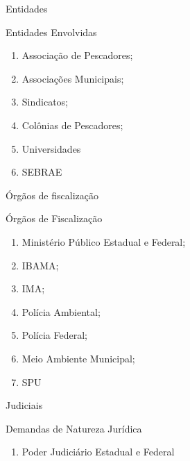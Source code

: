 \documentclass[ignorenonframetext,8pt]{beamer}
\begin{document}
\begin{frame}{Entidades}
\protect\hypertarget{entidades}{}

\begin{block}{Entidades Envolvidas}
\begin{enumerate}
  \item Associação de Pescadores;
  \item Associações Municipais;
  \item Sindicatos;
  \item Colônias de Pescadores;
  \item Universidades
  \item SEBRAE
\end{enumerate}
\end{block}

\end{frame}

\begin{frame}{Órgãos de fiscalização}
\protect\hypertarget{orgaos-de-fiscalizacao}{}

\begin{exampleblock}{\'{O}rg\~{a}os de Fiscaliza\c{c}\~{a}o}
\begin{enumerate}
  \item Ministério Público Estadual e Federal;
  \item IBAMA;
  \item IMA;
  \item Polícia Ambiental;
  \item Polícia Federal;
  \item Meio Ambiente Municipal;
  \item SPU
\end{enumerate}
\end{exampleblock}

\end{frame}

\begin{frame}{Judiciais}
\protect\hypertarget{judiciais}{}

\begin{alertblock}{Demandas de Natureza Jurídica}
\begin{enumerate}
  \item Poder Judiciário Estadual e Federal
\end{enumerate}
\end{alertblock}

\end{frame}
\end{document}
